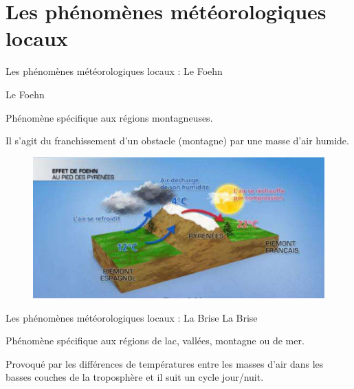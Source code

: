 \documentclass{beamer}
\begin{document}
\section{Les phénomènes météorologiques locaux}

\begin{frame}{Les phénomènes météorologiques locaux : Le Foehn}

  Le Foehn
  \pause
  
  Phénomène spécifique aux régions montagneuses.

  \pause

  Il s'agit du franchissement d'un obstacle (montagne) par une masse d'air humide.

  \pause

  \begin{figure}
    \centering
    \includegraphics[scale=1]{images/foehn.png}
  \end{figure}

\end{frame}

\begin{frame}{Les phénomènes météorologiques locaux : La Brise}
  La Brise
  \pause
  
  Phénomène spécifique aux régions de lac, vallées, montagne ou de mer.

  \pause

  Provoqué par les différences de températures entre les masses d’air
  dans les basses couches de la troposphère et il suit un cycle
  jour/nuit.

\end{frame}
\end{document}
